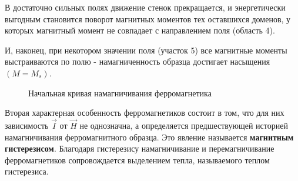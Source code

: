 \documentclass[a4paper,14pt]{article} %
\begin{document}
В достаточно сильных полях движение стенок прекращается, и энергетически выгодным становится поворот магнитных моментов тех оставшихся доменов, у которых магнитный момент не совпадает с направлением поля (область 4).

И, наконец, при некотором значении поля (участок 5) все магнитные моменты выстраиваются по полю - намагниченность образца достигает насыщения $\left(M=M_{s}\right)$.

\begin{figure}[H]
	\caption{Начальная кривая намагничивания ферромагнетика}
\end{figure}

Вторая характерная особенность ферромагнетиков состоит в том, что для них зависимость $\overrightarrow{I}$ от $\overrightarrow{H}$ не однозначна, а определяется предшествующей историей намагничивания ферромагнитного образца. Это явление называется \textbf{магнитным гистерезисом}. Благодаря гистерезису намагничивание и перемагничивание ферромагнетиков сопровождается выделением тепла, называемого теплом гистерезиса.
\end{document}
